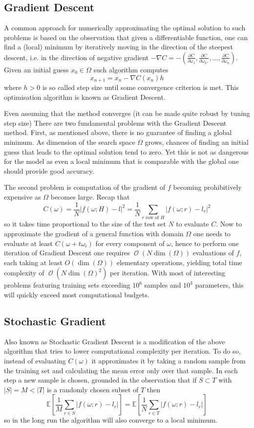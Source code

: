 \documentclass[a4paper]{article}
\theoremstyle{break}
\newcommand{\Exp}{\mathbb{E}}
\DeclareMathOperator{\bO}{\mathcal{O}}
\begin{document}
\subsection{Gradient Descent}
A common approach for numerically approximating the optimal solution to such problems is based on the observation that given a differentiable function, one can find a (local) minimum by iteratively moving in the direction of the steepest descent, i.e. in the direction of negative gradient $ - \nabla C  = - ( \frac{\partial C}{\partial \omega_1}, \frac{\partial C}{\partial \omega_2, }, ..., \frac{\partial C}{\partial \omega_n})$. Given an initial guess $x_0 \in \Omega$ such algorithm computes
    $$ x_{n+1} = x_{n} - \nabla C (x_n) h $$
where $h > 0$ is so called step size until some convergence criterion is met. This optimisation algorithm is known as Gradient Descent.

Even assuming that the method converges (it can be made quite robust by tuning step size) There are two fundamental problems with the Gradient Descent method. First, as mentioned above, there is no guarantee of finding a global minimum. As dimension of the search space $ \Omega $ grows, chances of finding an initial guess that leads to the optimal solution tend to zero. Yet this is not as dangerous for the model as even a local minimum that is comparable with the global one should provide good accuracy.

The second problem is computation of the gradient of $f$ becoming prohibitively expensive as $ \Omega $ becomes large. Recap that
    $$ C(\omega) =  \frac{1}{N} | f(\omega; H) - l |^2 =
       \frac{1}{N} \sum_{r \text{ row of } H} | f(\omega; r) - l_r |^2 $$
so it takes time proportional to the size of the test set $N$ to evaluate $C$.
Now to approximate the gradient of a general function with domain $ \Omega $ one needs to evaluate at least $C(\omega + t \omega_i)$ for every component of $ \omega $, hence to perform one iteration of Gradient Descent one requires $ \bO( N  \dim(\Omega) ) $ evaluations of $f$,
each taking at least $ O( \dim(\Omega))$ elementary operations, yielding total time complexity of $ \bO( N \dim(\Omega)^2)$ per iteration. With most of interesting problems featuring training sets exceeding $ 10^6 $ samples and $ 10^3 $ parameters, this will quickly exceed most computational budgets.

\subsection{Stochastic Gradient}
Also known as Stochastic Gradient Descent is a modification of the above algorithm that tries to lower computational complexity per iteration. To do so, instead of evaluating $C(\omega)$ it approximates it by taking a random sample from the training set and calculating the mean error only over that sample. In each step a new sample is chosen, grounded in the observation that if $ S \subset T $ with $ | S | = M < |T| $ is a randomly chosen subset of $T$ then
    $$ \Exp \left[ \frac{1}{M} \sum_{r \in S} | f(\omega; r) - l_r | \right] =
       \Exp \left[ \frac{1}{N} \sum_{r \in T} | f(\omega; r) - l_r | \right] $$
so in the long run the algorithm will also converge to a local minimum.
\end{document}
